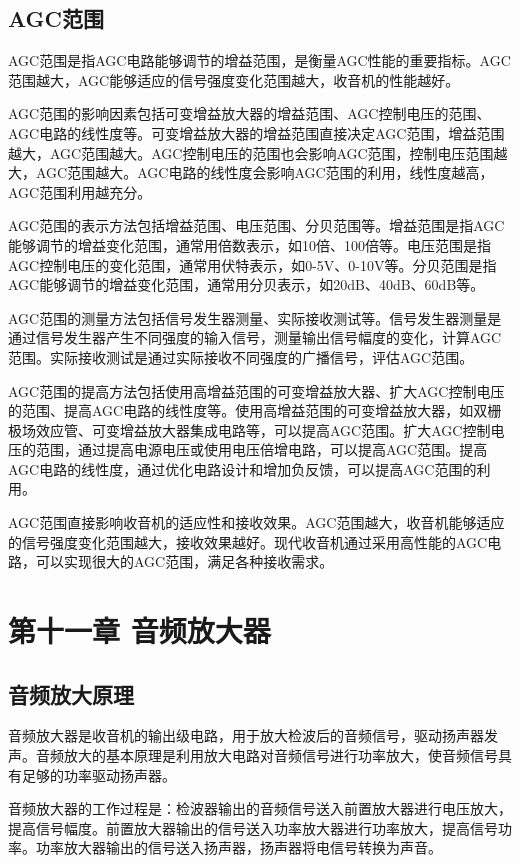 \documentclass[12pt,UTF8]{ctexbook}
\begin{document}
\section{AGC范围}

AGC范围是指AGC电路能够调节的增益范围，是衡量AGC性能的重要指标。AGC范围越大，AGC能够适应的信号强度变化范围越大，收音机的性能越好。

AGC范围的影响因素包括可变增益放大器的增益范围、AGC控制电压的范围、AGC电路的线性度等。可变增益放大器的增益范围直接决定AGC范围，增益范围越大，AGC范围越大。AGC控制电压的范围也会影响AGC范围，控制电压范围越大，AGC范围越大。AGC电路的线性度会影响AGC范围的利用，线性度越高，AGC范围利用越充分。

AGC范围的表示方法包括增益范围、电压范围、分贝范围等。增益范围是指AGC能够调节的增益变化范围，通常用倍数表示，如10倍、100倍等。电压范围是指AGC控制电压的变化范围，通常用伏特表示，如0-5V、0-10V等。分贝范围是指AGC能够调节的增益变化范围，通常用分贝表示，如20dB、40dB、60dB等。

AGC范围的测量方法包括信号发生器测量、实际接收测试等。信号发生器测量是通过信号发生器产生不同强度的输入信号，测量输出信号幅度的变化，计算AGC范围。实际接收测试是通过实际接收不同强度的广播信号，评估AGC范围。

AGC范围的提高方法包括使用高增益范围的可变增益放大器、扩大AGC控制电压的范围、提高AGC电路的线性度等。使用高增益范围的可变增益放大器，如双栅极场效应管、可变增益放大器集成电路等，可以提高AGC范围。扩大AGC控制电压的范围，通过提高电源电压或使用电压倍增电路，可以提高AGC范围。提高AGC电路的线性度，通过优化电路设计和增加负反馈，可以提高AGC范围的利用。

AGC范围直接影响收音机的适应性和接收效果。AGC范围越大，收音机能够适应的信号强度变化范围越大，接收效果越好。现代收音机通过采用高性能的AGC电路，可以实现很大的AGC范围，满足各种接收需求。

\chapter{第十一章 音频放大器}

\section{音频放大原理}

音频放大器是收音机的输出级电路，用于放大检波后的音频信号，驱动扬声器发声。音频放大的基本原理是利用放大电路对音频信号进行功率放大，使音频信号具有足够的功率驱动扬声器。

音频放大器的工作过程是：检波器输出的音频信号送入前置放大器进行电压放大，提高信号幅度。前置放大器输出的信号送入功率放大器进行功率放大，提高信号功率。功率放大器输出的信号送入扬声器，扬声器将电信号转换为声音。
\end{document}

